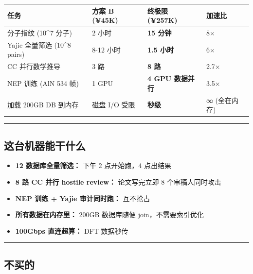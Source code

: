 \documentclass[
  12pt,
]{ctexart}
\providecommand{\tightlist}{%
  \setlength{\itemsep}{0pt}\setlength{\parskip}{0pt}}
\begin{document}
\begin{longtable}[]{@{}llll@{}}
\toprule\noalign{}
任务 & 方案 B (¥45K) & 终极限 (¥257K) & 加速比 \\
\midrule\noalign{}
\endhead
\bottomrule\noalign{}
\endlastfoot
分子指纹 (10\^{}7 分子) & 2 小时 & \textbf{15 分钟} & 8× \\
Yajie 全量筛选 (10\^{}8 pairs) & 8-12 小时 & \textbf{1.5 小时} & 6× \\
CC 并行数学推导 & 3 路 & \textbf{8 路} & 2.7× \\
NEP 训练 (AlN 534 帧) & 1 GPU & \textbf{4 GPU 数据并行} & 3.5× \\
加载 200GB DB 到内存 & 磁盘 I/O 受限 & \textbf{秒级} & ∞ (全在内存) \\
\end{longtable}

\begin{center}\rule{0.5\linewidth}{0.5pt}\end{center}

\subsection{这台机器能干什么}\label{ux8fd9ux53f0ux673aux5668ux80fdux5e72ux4ec0ux4e48}

\begin{itemize}
\tightlist
\item
  \textbf{12 数据库全量筛选：} 下午 2 点开始跑，4 点出结果
\item
  \textbf{8 路 CC 并行 hostile review：} 论文写完立即 8 个审稿人同时攻击
\item
  \textbf{NEP 训练 + Yajie 审计同时跑：} 互不抢占
\item
  \textbf{所有数据在内存里：} 200GB 数据库随便 join，不需要索引优化
\item
  \textbf{100Gbps 直连超算：} DFT 数据秒传
\end{itemize}

\begin{center}\rule{0.5\linewidth}{0.5pt}\end{center}

\subsection{不买的}\label{ux4e0dux4e70ux7684}
\end{document}
